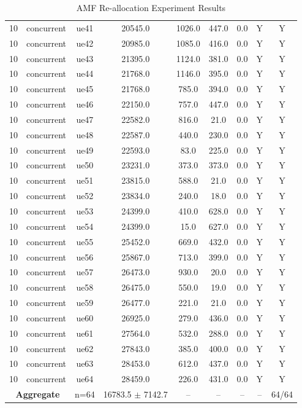 \begin{table}[ht]
\begin{tabular}{|c|c|c|c|c|c|c|c|c|}
10 & concurrent & ue41 & 20545.0 & 1026.0 & 447.0 & 0.0 & Y & Y \\
10 & concurrent & ue42 & 20985.0 & 1085.0 & 416.0 & 0.0 & Y & Y \\
10 & concurrent & ue43 & 21395.0 & 1124.0 & 381.0 & 0.0 & Y & Y \\
10 & concurrent & ue44 & 21768.0 & 1146.0 & 395.0 & 0.0 & Y & Y \\
10 & concurrent & ue45 & 21768.0 & 785.0 & 394.0 & 0.0 & Y & Y \\
10 & concurrent & ue46 & 22150.0 & 757.0 & 447.0 & 0.0 & Y & Y \\
10 & concurrent & ue47 & 22582.0 & 816.0 & 21.0 & 0.0 & Y & Y \\
10 & concurrent & ue48 & 22587.0 & 440.0 & 230.0 & 0.0 & Y & Y \\
10 & concurrent & ue49 & 22593.0 & 83.0 & 225.0 & 0.0 & Y & Y \\
10 & concurrent & ue50 & 23231.0 & 373.0 & 373.0 & 0.0 & Y & Y \\
10 & concurrent & ue51 & 23815.0 & 588.0 & 21.0 & 0.0 & Y & Y \\
10 & concurrent & ue52 & 23834.0 & 240.0 & 18.0 & 0.0 & Y & Y \\
10 & concurrent & ue53 & 24399.0 & 410.0 & 628.0 & 0.0 & Y & Y \\
10 & concurrent & ue54 & 24399.0 & 15.0 & 627.0 & 0.0 & Y & Y \\
10 & concurrent & ue55 & 25452.0 & 669.0 & 432.0 & 0.0 & Y & Y \\
10 & concurrent & ue56 & 25867.0 & 713.0 & 399.0 & 0.0 & Y & Y \\
10 & concurrent & ue57 & 26473.0 & 930.0 & 20.0 & 0.0 & Y & Y \\
10 & concurrent & ue58 & 26475.0 & 550.0 & 19.0 & 0.0 & Y & Y \\
10 & concurrent & ue59 & 26477.0 & 221.0 & 21.0 & 0.0 & Y & Y \\
10 & concurrent & ue60 & 26925.0 & 279.0 & 436.0 & 0.0 & Y & Y \\
10 & concurrent & ue61 & 27564.0 & 532.0 & 288.0 & 0.0 & Y & Y \\
10 & concurrent & ue62 & 27843.0 & 385.0 & 400.0 & 0.0 & Y & Y \\
10 & concurrent & ue63 & 28453.0 & 612.0 & 437.0 & 0.0 & Y & Y \\
10 & concurrent & ue64 & 28459.0 & 226.0 & 431.0 & 0.0 & Y & Y \\
\multicolumn{2}{|c|}{\textbf{Aggregate}} & n=64 & 16783.5 $\pm$ 7142.7 & -- & -- & -- & -- & 64/64 \\
\hline
\end{tabular}
\caption{AMF Re-allocation Experiment Results}
\label{tab:amf_realloc}
\end{table}
